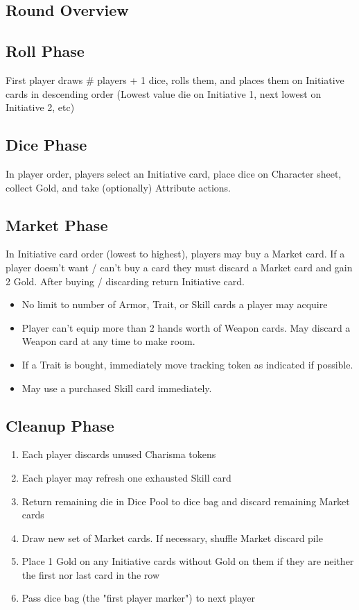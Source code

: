 \documentclass[12pt]{article}
\newenvironment{enumerateCustom}
{\begin{enumerate}
  \setlength{\itemsep}{1pt}
  \setlength{\parskip}{0pt}
  \setlength{\parsep}{0pt}}
{\end{enumerate}}
\newenvironment{itemizeCustom}
{\begin{itemize}
  \setlength{\itemsep}{1pt}
  \setlength{\parskip}{0pt}
  \setlength{\parsep}{0pt}}
{\end{itemize}}
\begin{document}
\begin{multicols*}{2}
\section*{Round Overview}
    \subsection*{Roll Phase}
    First player draws \# players + 1 dice, rolls them, and places them on Initiative cards in descending order (Lowest value die on Initiative 1, next lowest on Initiative 2, etc)

    \subsection*{Dice Phase}
    In player order, players select an Initiative card, place dice on Character sheet, collect Gold, and take (optionally) Attribute actions.

    \subsection*{Market Phase}
    In Initiative card order (lowest to highest), players may buy a Market card. If a player doesn't want / can't buy a card they must discard a Market card and gain 2 Gold. After buying / discarding return Initiative card.
    \begin{itemizeCustom}
        \item No limit to number of Armor, Trait, or Skill cards a player may acquire
        \item Player can't equip more than 2 hands worth of Weapon cards. May discard a Weapon card at any time to make room.
        \item If a Trait is bought, immediately move tracking token as indicated if possible.
        \item May use a purchased Skill card immediately.
    \end{itemizeCustom}

    \subsection*{Cleanup Phase}
    \begin{enumerateCustom}
        \item Each player discards unused Charisma tokens
        \item Each player may refresh one exhausted Skill card
        \item Return remaining die in Dice Pool to dice bag and discard remaining Market cards
        \item Draw new set of Market cards. If necessary, shuffle Market discard pile
        \item Place 1 Gold on any Initiative cards without Gold on them if they are neither the first nor last card in the row
        \item Pass dice bag (the "first player marker") to next player
            

\end{enumerateCustom}
\end{multicols*}
\end{document}
